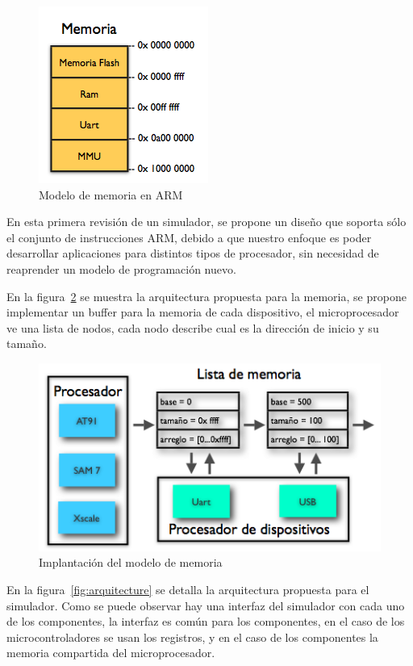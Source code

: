 \begin{figure}[H]
\centering
\includegraphics[scale=0.5]{memoria}
\caption{Modelo de memoria en ARM}\label{fig:memoria}
\end{figure}

En esta primera revisi\'on de un simulador, se propone un dise\~no que soporta s\'olo el conjunto de instrucciones ARM, debido a que nuestro enfoque es poder desarrollar aplicaciones para distintos tipos de procesador, sin necesidad de reaprender un modelo de programaci\'on nuevo.\medskip

En la figura~\ref{fig:implementacion_memoria} se muestra la arquitectura propuesta para la memoria, se propone implementar un buffer para la memoria de cada dispositivo, el microprocesador ve una lista de nodos, cada nodo describe cual es la direcci\'on de inicio y su tama\~no.\medskip

\begin{figure}[H]
\centering
\includegraphics[scale=0.5]{implementacion_memoria}
\caption{Implantaci\'on del modelo de memoria}\label{fig:implementacion_memoria}
\end{figure}

En la figura~\ref{fig:arquitecture} se detalla la arquitectura propuesta para el simulador. Como se puede observar hay una interfaz del simulador con cada uno de los componentes, la interfaz es com\'un para los componentes, en el caso de los microcontroladores se usan los registros, y en el caso de los componentes la memoria compartida del microprocesador.\medskip


